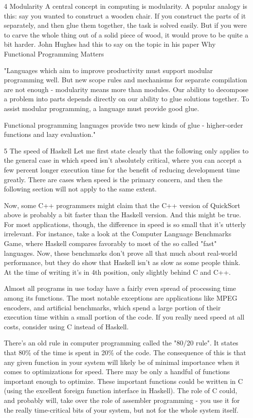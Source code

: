 \documentclass[main.tex]{subfiles}
\begin{document}
{{4 Modularity
A central concept in computing is modularity. A popular analogy is this: say you wanted to construct a wooden chair. If you construct the parts of it separately, and then glue them together, the task is solved easily. But if you were to carve the whole thing out of a solid piece of wood, it would prove to be quite a bit harder. John Hughes had this to say on the topic in his paper Why Functional Programming Matters

"Languages which aim to improve productivity must support modular programming well. But new scope rules and mechanisms for separate compilation are not enough - modularity means more than modules. Our ability to decompose a problem into parts depends directly on our ability to glue solutions together. To assist modular programming, a language must provide good glue.

Functional programming languages provide two new kinds of glue - higher-order functions and lazy evaluation."


5 The speed of Haskell
Let me first state clearly that the following only applies to the general case in which speed isn't absolutely critical, where you can accept a few percent longer execution time for the benefit of reducing development time greatly. There are cases when speed is the primary concern, and then the following section will not apply to the same extent.

Now, some C++ programmers might claim that the C++ version of QuickSort above is probably a bit faster than the Haskell version. And this might be true. For most applications, though, the difference in speed is so small that it's utterly irrelevant. For instance, take a look at the Computer Language Benchmarks Game, where Haskell compares favorably to most of the so called "fast" languages. Now, these benchmarks don't prove all that much about real-world performance, but they do show that Haskell isn't as slow as some people think. At the time of writing it's in 4th position, only slightly behind C and C++.

Almost all programs in use today have a fairly even spread of processing time among its functions. The most notable exceptions are applications like MPEG encoders, and artificial benchmarks, which spend a large portion of their execution time within a small portion of the code. If you really need speed at all costs, consider using C instead of Haskell.

There's an old rule in computer programming called the "80/20 rule". It states that 80\% of the time is spent in 20\% of the code. The consequence of this is that any given function in your system will likely be of minimal importance when it comes to optimizations for speed. There may be only a handful of functions important enough to optimize. These important functions could be written in C (using the excellent foreign function interface in Haskell). The role of C could, and probably will, take over the role of assembler programming - you use it for the really time-critical bits of your system, but not for the whole system itself.

}}
\end{document}
